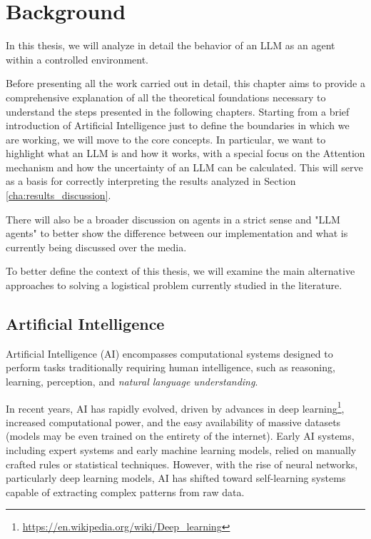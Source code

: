 \chapter{Background}
\label{cha:background}

In this thesis, we will analyze in detail the behavior of an LLM as an agent within
a controlled environment.

Before presenting all the work carried out in detail, this chapter aims to
provide a comprehensive explanation of all the theoretical foundations necessary
to understand the steps presented in the following chapters. Starting from a brief
introduction of Artificial Intelligence just to define the boundaries in which we
are working, we will move to the core concepts. In particular, we want to
highlight what an LLM is and how it works, with a special focus on the Attention
mechanism and how the uncertainty of an LLM can be calculated. This will serve
as a basis for correctly interpreting the results analyzed in Section
\ref{cha:results_discussion}.

There will also be a broader discussion on agents in a strict sense and "LLM agents"
to better show the difference between our implementation and what is currently
being discussed over the media.

To better define the context of this thesis, we will examine the main alternative
approaches to solving a logistical problem currently studied in the literature.

\section{Artificial Intelligence}
\label{sec:artificial_intelligence}

Artificial Intelligence (AI) encompasses computational systems designed to
perform tasks traditionally requiring human intelligence, such as reasoning,
learning, perception, and \emph{natural language understanding}.

In recent years, AI has rapidly evolved, driven by advances in deep learning\footnote{\url{https://en.wikipedia.org/wiki/Deep_learning}},
increased computational power, and the easy availability of massive datasets (models
may be even trained on the entirety of the internet). Early AI systems,
including expert systems and early machine learning models, relied on manually crafted
rules or statistical techniques. However, with the rise of neural networks,
particularly deep learning models, AI has shifted toward self-learning systems capable
of extracting complex patterns from raw data.

